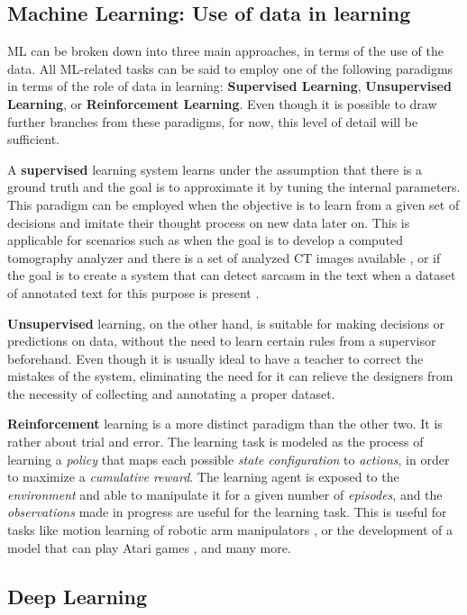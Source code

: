 \subsection{Machine Learning: Use of data in learning}

\ac{ML} can be broken down into three main approaches, in terms of the use of the data. All \ac{ML}-related tasks can be said to employ one of the following paradigms in terms of the role of data in learning: \textbf{Supervised Learning}, \textbf{Unsupervised Learning}, or \textbf{Reinforcement Learning}. Even though it is possible to draw further branches from these paradigms, for now, this level of detail will be sufficient.

A \textbf{supervised} learning system learns under the assumption that there is a ground truth and the goal is to approximate it by tuning the internal parameters. This paradigm can be employed when the objective is to learn from a given set of decisions and imitate their thought process on new data later on. This is applicable for scenarios such as when the goal is to develop a computed tomography analyzer and there is a set of analyzed CT images available \cite{strokedet}, or if the goal is to create a system that can detect sarcasm in the text when a dataset of annotated text for this purpose is present \cite{sarcasmdet}.

\textbf{Unsupervised} learning, on the other hand, is suitable for making decisions or predictions on data, without the need to learn certain rules from a supervisor beforehand. Even though it is usually ideal to have a teacher to correct the mistakes of the system, eliminating the need for it can relieve the designers from the necessity of collecting and annotating a proper dataset. 

\textbf{Reinforcement} learning is a more distinct paradigm than the other two. It is rather about trial and error. The learning task is modeled as the process of learning a \textit{policy} that maps each possible \textit{state configuration} to \textit{actions}, in order to maximize a \textit{cumulative reward}. The learning agent is exposed to the \textit{environment} and able to manipulate it for a given number of \textit{episodes}, and the \textit{observations} made in progress are useful for the learning task. This is useful for tasks like motion learning of robotic arm manipulators \cite{robotRL}, or the development of a model that can play Atari games \cite{atariRL}, and many more.

\subsection{Deep Learning}

